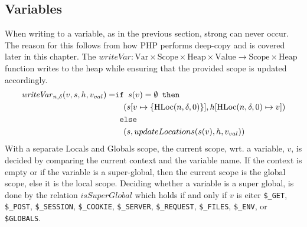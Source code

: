 \subsection{Variables}
When writing to a variable, as in the previous section, strong can never occur. The reason for this follows from how PHP performs deep-copy and is covered later in this chapter. The $\mathit{writeVar}: \text{Var} \times \text{Scope} \times \text{Heap} \times \text{Value} \rightarrow \text{Scope} \times \text{Heap}$ function writes to the heap while ensuring that the provided scope is updated accordingly. 
\begin{align}
\mathit{writeVar}_{n,\delta}(v,s,h,v_{val}) =  &\texttt{if }s(v) = \emptyset\texttt{ then } \notag\\
                            &\quad (s[v\mapsto\{\text{HLoc}(n,\delta, 0)\}],h[\text{HLoc}(n,\delta, 0)\mapsto v]) \notag\\
                            & \texttt{ else } \notag\\
                            &\quad (s, updateLocations(s(v), h, v_{val}))
\end{align}
With a separate { Locals} and { Globals} scope, the current scope, wrt. a variable, $v$, is decided by comparing the current context and the variable name. If the context is empty or if the variable is a super-global, then the current scope is the global scope, else it is the local scope. Deciding whether a variable is a super global, is done by the relation $\mathit{isSuperGlobal}$ which holds if and only if $v$ is eiter \texttt{\$\_GET}, \texttt{\$\_POST}, \texttt{\$\_SESSION}, \texttt{\$\_COOKIE}, \texttt{\$\_SERVER}, \texttt{\$\_REQUEST}, \texttt{\$\_FILES}, \texttt{\$\_ENV}, or \texttt{\$GLOBALS}.

